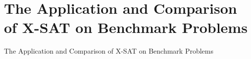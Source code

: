 \chapter{The Application and Comparison of X-SAT on Benchmark Problems}{The Application and Comparison of X-SAT on Benchmark Problems} \label{chapter:dpllapp}